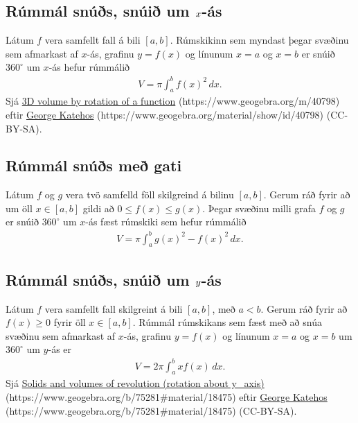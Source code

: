 \documentclass[b5paper,11pt,icelandic]{sphinxmanual}
\begin{document}

\subsection{Rúmmál snúðs, snúið um \protect\(x\protect\)-ás}
\label{kafli07:rummal-snus-snui-um-as}\label{kafli07:index-3}
Látum \(f\) vera samfellt fall á bili \([a, b]\). Rúmskikinn sem
myndast þegar svæðinu sem afmarkast af \(x\)-ás, grafinu
\(y=f(x)\) og línunum \(x=a\) og \(x=b\) er snúið
\(360^\circ\) um \(x\)-ás hefur rúmmálið
\begin{equation*}
\begin{split}V=\pi\int_a^b f(x)^2\,dx.\end{split}
\end{equation*}
Sjá  \href{https://www.geogebra.org/m/40798}{3D volume by rotation of a function} (https://www.geogebra.org/m/40798)
eftir \href{https://www.geogebra.org/material/show/id/40798}{George Katehos} (https://www.geogebra.org/material/show/id/40798) (CC-BY-SA).


\subsection{Rúmmál snúðs með gati}
\label{kafli07:rummal-snus-me-gati}\label{kafli07:index-4}
Látum \(f\) og \(g\) vera tvö samfelld föll skilgreind á bilinu
\([a, b]\). Gerum ráð fyrir að um öll \(x\in [a, b]\) gildi að
\(0\leq f(x)\leq
g(x)\). Þegar svæðinu milli grafa \(f\) og \(g\) er snúið
\(360^\circ\) um \(x\)-ás fæst rúmskiki sem hefur rúmmálið
\begin{equation*}
\begin{split}V=\pi\int_a^b g(x)^2-f(x)^2\,dx.\end{split}
\end{equation*}

\subsection{Rúmmál snúðs, snúið um \protect\(y\protect\)-ás}
\label{kafli07:index-5}\label{kafli07:id1}
Látum \(f\) vera samfellt fall skilgreint á bili \([a, b]\), með
\(a<b\). Gerum ráð fyrir að \(f(x)\geq 0\) fyrir öll
\(x\in [a, b]\). Rúmmál rúmskikans sem fæst með að snúa svæðinu sem
afmarkast af \(x\)-ás, grafinu \(y=f(x)\) og línunum \(x=a\)
og \(x=b\) um \(360^\circ\) um \(y\)-ás er
\begin{equation*}
\begin{split}V=2\pi\int_a^b xf(x)\,dx.\end{split}
\end{equation*}
Sjá \href{https://www.geogebra.org/b/75281\#material/18475}{Solids and volumes of revolution (rotation about y\_axis)} (https://www.geogebra.org/b/75281\#material/18475)
eftir \href{https://www.geogebra.org/b/75281\#material/18475}{George Katehos} (https://www.geogebra.org/b/75281\#material/18475) (CC-BY-SA).
\end{document}
